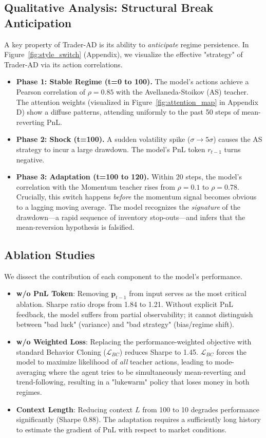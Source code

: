 \documentclass{article}
\begin{document}
\subsection{Qualitative Analysis: Structural Break Anticipation}
A key property of Trader-AD is its ability to \emph{anticipate} regime persistence.
In Figure~\ref{fig:style_switch} (Appendix), we visualize the effective "strategy" of Trader-AD via its action correlations.
\begin{itemize}
    \item \textbf{Phase 1: Stable Regime (t=0 to 100).} The model's actions achieve a Pearson correlation of $\rho=0.85$ with the Avellaneda-Stoikov (AS) teacher. The attention weights (visualized in Figure~\ref{fig:attention_map} in Appendix D) show a diffuse patterns, attending uniformly to the past 50 steps of mean-reverting PnL.
    \item \textbf{Phase 2: Shock (t=100).} A sudden volatility spike ($\sigma \to 5\sigma$) causes the AS strategy to incur a large drawdown. The model's PnL token $r_{t-1}$ turns negative.
    \item \textbf{Phase 3: Adaptation (t=100 to 120).} Within 20 steps, the model's correlation with the Momentum teacher rises from $\rho=0.1$ to $\rho=0.78$. Crucially, this switch happens \emph{before} the momentum signal becomes obvious to a lagging moving average. The model recognizes the \emph{signature} of the drawdown---a rapid sequence of inventory stop-outs---and infers that the mean-reversion hypothesis is falsified.
\end{itemize}

\subsection{Ablation Studies}
We dissect the contribution of each component to the model's performance.
\begin{itemize}
    \item \textbf{w/o PnL Token}: Removing $\mathbf{p}_{t-1}$ from input serves as the most critical ablation. Sharpe ratio drops from 1.84 to 1.21. Without explicit PnL feedback, the model suffers from partial observability; it cannot distinguish between "bad luck" (variance) and "bad strategy" (bias/regime shift).
    \item \textbf{w/o Weighted Loss}: Replacing the performance-weighted objective with standard Behavior Cloning ($\mathcal{L}_{BC}$) reduces Sharpe to 1.45. $\mathcal{L}_{BC}$ forces the model to maximize likelihood of \emph{all} teacher actions, leading to mode-averaging where the agent tries to be simultaneously mean-reverting and trend-following, resulting in a "lukewarm" policy that loses money in both regimes.
    \item \textbf{Context Length}: Reducing context $L$ from 100 to 10 degrades performance significantly (Sharpe 0.88). The adaptation requires a sufficiently long history to estimate the gradient of PnL with respect to market conditions.
\end{itemize}
\end{document}
